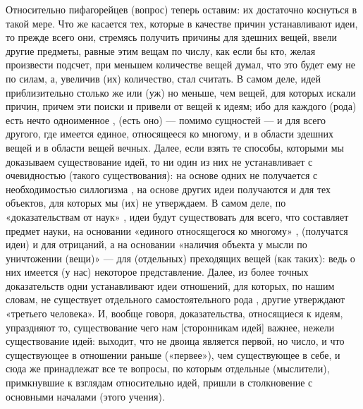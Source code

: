 \documentclass{article}
\begin{document}
Относительно пифагорейцев (вопрос) теперь оставим: их достаточно коснуться в такой мере. Что же касается тех, которые в качестве причин устанавливают идеи, то прежде всего они, стремясь получить причины для здешних вещей, ввели другие предметы, равные этим вещам по числу, как если бы кто, желая произвести подсчет, при меньшем количестве вещей думал, что это будет ему не по силам, а, увеличив (их) количество, стал считать. В самом деле, идей приблизительно столько же или (уж) но меньше, чем вещей, для которых искали причин, причем эти поиски
\footnotemark[1]
и привели от вещей к идеям; ибо для каждого (рода) есть нечто одноименное
\footnotemark[2]
, (есть оно) — помимо сущностей — и для всего другого, где имеется единое, относящееся ко многому, и в области здешних вещей и в области вещей вечных. Далее, если взять те способы, которыми мы
\footnotemark[3]
доказываем существование идей, то ни один из них не устанавливает с очевидностью (такого существования): на основе одних не получается с необходимостью силлогизма
\footnotemark[4]
, на основе других идеи получаются и для тех объектов, для которых мы (их) не утверждаем. В самом деле, по «доказательствам от наук»
\footnotemark[5]
, идеи будут существовать для всего, что составляет предмет науки, на основании «единого относящегося ко многому»
\footnotemark[6]
, (получатся идеи) и для отрицаний, а на основании «наличия объекта у мысли по уничтожении (вещи)»
\footnotemark[7]
— для (отдельных) преходящих вещей (как таких): ведь о них имеется (у нас) некоторое представление. Далее, из более точных доказательств
\footnotemark[8]
одни устанавливают идеи отношений, для которых, по нашим словам, не существует отдельного самостоятельного рода
\footnotemark[9]
, другие утверждают «третьего человека».
\footnotemark[10]
И, вообще говоря, доказательства, относящиеся к идеям, упраздняют то, существование чего нам [сторонникам идей] важнее, нежели существование идей: выходит, что не двоица является первой, но число, и что существующее в отношении раньше («первее»), чем существующее в себе, и сюда же принадлежат все те вопросы, по которым отдельные (мыслители), примкнувшие к взглядам относительно идей, пришли в столкновение с основными началами (этого учения).
\end{document}
